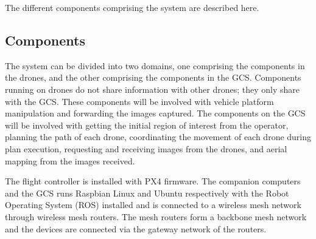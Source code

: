 The different components comprising the system are described here.

\subsection{Components}

The system can be divided into two domains, one comprising the components in the drones, and the other comprising the components in the GCS. Components running on drones do not share information with other drones; they only share with the GCS. These components will be involved with vehicle platform manipulation and forwarding the images captured. The components on the GCS will be involved with getting the initial region of interest from the operator, planning the path of each drone, coordinating the movement of each drone during plan execution, requesting and receiving images from the drones, and aerial mapping from the images received.

The flight controller is installed with PX4 firmware. The companion computers and the GCS runs Raspbian Linux and Ubuntu respectively with the Robot Operating System (ROS) installed and is connected to a wireless mesh network through wireless mesh routers. The mesh routers form a backbone mesh network and the devices are connected via the gateway network of the routers.

